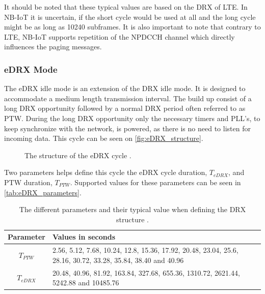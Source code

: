 It should be noted that these typical values are based on the DRX of LTE. In NB-IoT it is uncertain, if the short cycle would be used at all and the long cycle might be as long as 10240 subframes. It is also important to note that contrary to LTE, NB-IoT supports repetition of the NPDCCH channel which directly influences the paging messages. \citep{NB-IoT_Book}


\subsubsection{eDRX Mode}
The eDRX idle mode is an extension of the DRX idle mode. It is designed to accommodate a medium length transmission interval. The build up consist of a long DRX opportunity followed by a normal DRX period often referred to as \gls{PTW}. During the long DRX opportunity only the necessary timers and \gls{PLL}'s, to keep synchronize with the network, is powered, as there is no need to listen for incoming data. This cycle can be seen on \autoref{fig:eDRX_structure}.

\begin{figure}[H]
\centering
\resizebox{\textwidth}{!}{
}
\caption{The structure of the \gls{eDRX} cycle \citep{NB-IoT_Book}.}
\label{fig:eDRX_structure}
\end{figure}

Two parameters helps define this cycle the eDRX cycle duration, $T_{eDRX}$, and \gls{PTW} duration, $T_{PTW}$. Supported values for these parameters can be seen in \autoref{tab:eDRX_parameters}.

\begin{table}[H]
\centering
\begin{tabular}{|c|p{8cm}|} \hline
\textbf{Parameter} & \textbf{Values in seconds} \\ \hline 
$T_{PTW}$ & 2.56, 5.12, 7.68, 10.24, 12.8, 15.36, 17.92, 20.48, 23.04, 25.6, 28.16, 30.72, 33.28, 35.84, 38.40 and 40.96\\ \hline
$T_{eDRX}$ & 20.48, 40.96, 81.92, 163.84, 327.68, 655.36, 1310.72, 2621.44, 5242.88 and 10485.76 \\ \hline
\end{tabular}
\caption{The different parameters and their typical value when defining the DRX structure \citep{book_LTE_for_UMTS}.}
\label{tab:eDRX_parameters}
\end{table}

